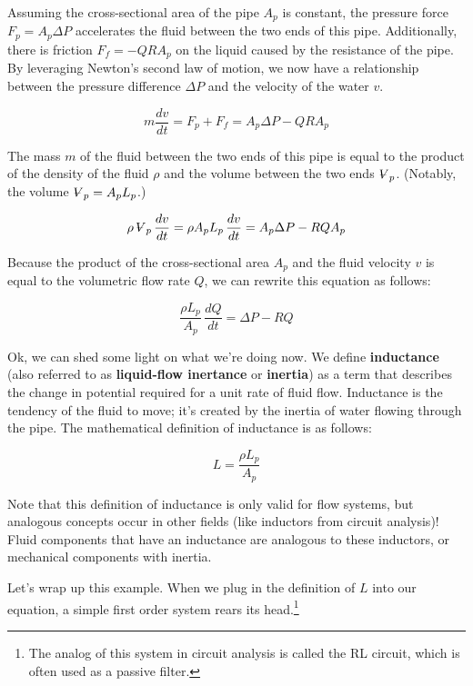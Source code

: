 \documentclass{report}
\newcommand{\Volume}{{\ooalign{\hfil$V$\hfil\cr\kern0.08em--\hfil\cr}}}
\begin{document}
\begin{onehalfspacing}
\begin{flushleft}
Assuming the cross-sectional area of the pipe \(A_p\) is constant, the pressure force \(F_p = A_p \Delta P\) accelerates the fluid between the two ends of this pipe. Additionally, there is friction \(F_f = -QRA_p\) on the liquid caused by the resistance of the pipe. By leveraging Newton's second law of motion, we now have a relationship between the pressure difference \(\Delta P\) and the velocity of the water \(v\).

\vspace{-0.1in}
\[m \frac{dv}{dt} = F_p + F_f = A_p \Delta P - Q R A_p\]

The mass \(m\) of the fluid between the two ends of this pipe is equal to the product of the density of the fluid \(\rho\) and the volume between the two ends \(\Volume_p\). (Notably, the volume \(\Volume_p = A_p L_p\).)

\vspace{-0.1in}
\[\rho \, \Volume_p \, \frac{dv}{dt} = \rho A_p L_p \, \frac{dv}{dt} = A_p \Delta P - RQ A_p\]

Because the product of the cross-sectional area \(A_p\) and the fluid velocity \(v\) is equal to the volumetric flow rate \(Q\), we can rewrite this equation as follows:

\vspace{-0.1in}
\[\frac{\rho L_p}{A_p} \, \frac{dQ}{dt} = \Delta P - RQ\]

Ok, we can shed some light on what we're doing now. We define \textbf{inductance} (also referred to as \textbf{liquid-flow inertance} or \textbf{inertia}) as a term that describes the change in potential required for a unit rate of fluid flow. Inductance is the tendency of the fluid to move; it's created by the inertia of water flowing through the pipe. The mathematical definition of inductance is as follows:

\vspace{-0.1in}
\[L = \frac{\rho L_p}{A_p}\]

Note that this definition of inductance is only valid for flow systems, but analogous concepts occur in other fields (like inductors from circuit analysis)! Fluid components that have an inductance are analogous to these inductors, or mechanical components with inertia. 

\medskip

Let's wrap up this example. When we plug in the definition of \(L\) into our equation, a simple first order system rears its head.\footnote{The analog of this system in circuit analysis is called the RL circuit, which is often used as a passive filter.}


\end{flushleft}
\end{onehalfspacing}
\end{document}
